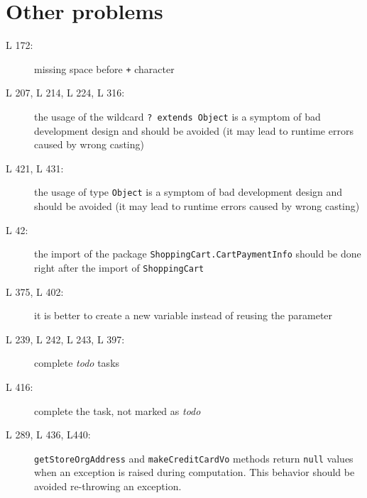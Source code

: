 \section{Other problems}
\begin{description}
	\item[L 172:] missing space before {\tt +} character
	\item[L 207, L 214, L 224, L 316:] the usage of the wildcard {\tt ? extends Object} is a symptom of bad development design and should be avoided (it may lead to runtime errors caused by wrong casting)
	\item[L 421, L 431:] the usage of type {\tt Object} is a symptom of bad development design and should be avoided (it may lead to runtime errors caused by wrong casting)
	\item[L 42:] the import of the package {\tt ShoppingCart.CartPaymentInfo} should be done right after the import of {\tt ShoppingCart}
	\item[L 375, L 402:] it is better to create a new variable instead of reusing the parameter
	\item[L 239, L 242, L 243, L 397:]  complete \emph{todo} tasks
	\item[L 416:] complete the task, not marked as \emph{todo}
	\item[L 289, L 436, L440:] {\tt getStoreOrgAddress} and {\tt makeCreditCardVo} methods return {\tt null} values when an exception is raised during computation. This behavior should be avoided re-throwing an exception.
\end{description}